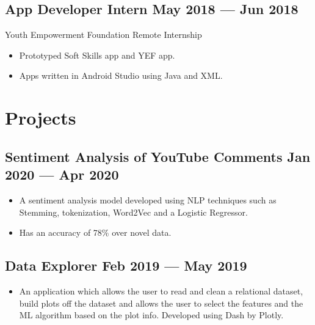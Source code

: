 \documentclass[a4,10pt]{article}
\newcommand{\subtext}[1]{
#1\par\vspace{-0.2cm}}
\newenvironment{zitemize}{
\begin{itemize}\itemsep0pt \parskip0pt \parsep1pt}
{\end{itemize}\vspace{-0.5cm}}
\begin{document}
\subsection*{App Developer Intern  \hfill May 2018 --- Jun 2018} 
\subtext{Youth Empowerment Foundation \hfill Remote Internship} 
    \begin{zitemize}
        \item Prototyped Soft Skills app and YEF app.
        \item Apps written in Android Studio using Java and XML.
    \end{zitemize}



\section{Projects} %


\subsection*{Sentiment Analysis of YouTube Comments \hfill Jan 2020 --- Apr 2020} 
    \begin{zitemize}
        \item A sentiment analysis model developed using NLP techniques such as Stemming, tokenization, Word2Vec and a Logistic Regressor.
        \item Has an accuracy of 78\% over novel data.
    \end{zitemize}

\subsection*{Data Explorer \hfill Feb 2019 --- May 2019} 
    \begin{zitemize}
        \item An application which allows the user to read and clean a relational dataset, build plots off the dataset and allows the user to select the features and the ML algorithm based on the plot info. Developed using Dash by Plotly.
    \end{zitemize}
\end{document}
